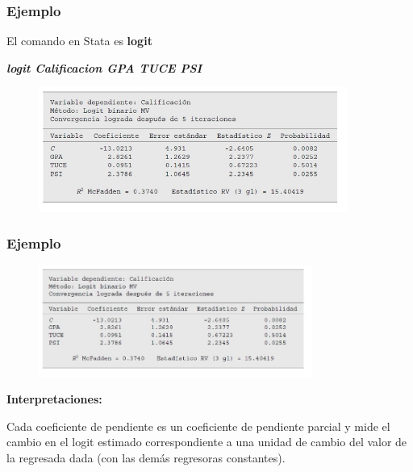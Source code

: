 \documentclass[10pt]{beamer}
\begin{document}
\begin{frame}
\frametitle{Ejemplo}

El comando en Stata es \textbf{logit}

\pause
\vspace{4mm}

\textit{\textbf{logit Calificacion GPA TUCE PSI}}

\pause

\begin{figure}
\begin{center}
    \includegraphics[width=0.9\textwidth]{9_6.JPG}
\end{center}
\end{figure}


\end{frame}





\begin{frame}
\frametitle{Ejemplo}

\begin{figure}
\begin{center}
    \includegraphics[width=0.8\textwidth]{9_6.JPG}
\end{center}
\end{figure}


\textbf{Interpretaciones:}

\vspace{4mm}
Cada coeficiente de pendiente es un coeficiente de pendiente parcial y mide el cambio en el logit estimado correspondiente a una unidad de cambio del valor de la regresada dada (con las demás regresoras constantes).


\end{frame}
\end{document}
